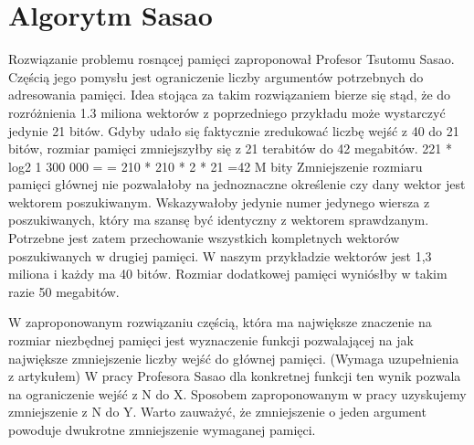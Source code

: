 \section{Algorytm Sasao}
Rozwiązanie problemu rosnącej pamięci zaproponował Profesor Tsutomu Sasao. Częścią jego pomysłu jest ograniczenie liczby argumentów potrzebnych do adresowania pamięci. Idea stojąca za takim rozwiązaniem bierze się stąd, że do rozróżnienia 1.3 miliona wektorów z poprzedniego przykładu może wystarczyć jedynie 21 bitów. Gdyby udało się faktycznie zredukować liczbę wejść z 40 do 21 bitów, rozmiar pamięci zmniejszyłby się z 21 terabitów do 42 megabitów.
221 * log2 1 300 000 =
= 210 * 210 * 2 * 21 =42 M bity
Zmniejszenie rozmiaru pamięci głównej nie pozwalałoby na jednoznaczne określenie czy dany wektor jest wektorem poszukiwanym. Wskazywałoby jedynie numer jedynego wiersza z poszukiwanych, który ma szansę być identyczny z wektorem sprawdzanym. Potrzebne jest zatem przechowanie wszystkich kompletnych wektorów poszukiwanych w drugiej pamięci. W naszym przykładzie wektorów jest 1,3 miliona i każdy ma 40 bitów. Rozmiar dodatkowej pamięci wyniósłby w takim razie 50 megabitów.

W zaproponowanym rozwiązaniu częścią, która ma największe znaczenie na rozmiar niezbędnej pamięci jest wyznaczenie funkcji pozwalającej na jak największe zmniejszenie liczby wejść do głównej pamięci.
(Wymaga uzupełnienia z artykułem) W pracy Profesora Sasao dla konkretnej funkcji ten wynik pozwala na ograniczenie wejść z N do X. Sposobem zaproponowanym w pracy uzyskujemy zmniejszenie z N do Y. Warto zauważyć, że zmniejszenie o jeden argument powoduje dwukrotne zmniejszenie wymaganej pamięci.

